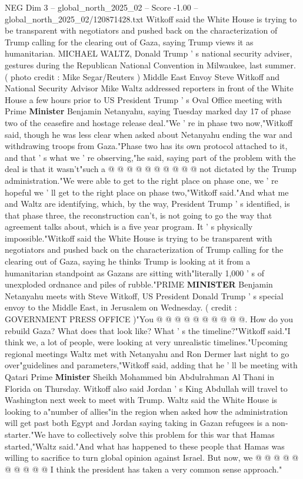 \begin{textsample}{NEG Dim 3 – global\_north\_2025\_02 – Score -1.00 – global\_north\_2025\_02/120871428.txt}  \label{ex:f3_neg_169}
Witkoff said the White House is trying to be transparent with negotiators and pushed back on the characterization of Trump calling for the clearing out of Gaza, saying Trump views it as humanitarian.
MICHAEL WALTZ, Donald Trump ' s national security adviser, gestures during the Republican National Convention in Milwaukee, last summer. ( photo credit : Mike Segar/Reuters ) Middle East Envoy Steve Witkoff and National Security Advisor Mike Waltz addressed reporters in front of the White House a few hours prior to US President Trump ' s Oval Office meeting with Prime \textbf{Minister} Benjamin Netanyahu, saying Tuesday marked day 17 of phase two of the ceasefire and hostage release deal."We ' re in phase two now,"Witkoff said, though he was less clear when asked about Netanyahu ending the war and withdrawing troops from Gaza."Phase two has its own protocol attached to it, and that ' s what we ' re observing,"he said, saying part of the problem with the deal is that it wasn't"such a @ @ @ @ @ @ @ @ @ @ not dictated by the Trump administration."We were able to get to the right place on phase one, we ' re hopeful we ' ll get to the right place on phase two,"Witkoff said."And what me and Waltz are identifying, which, by the way, President Trump ' s identified, is that phase three, the reconstruction can't, is not going to go the way that agreement talks about, which is a five year program.
It ' s physically impossible."Witkoff said the White House is trying to be transparent with negotiators and pushed back on the characterization of Trump calling for the clearing out of Gaza, saying he thinks Trump is looking at it from a humanitarian standpoint as Gazans are sitting with"literally 1,000 ' s of unexploded ordnance and piles of rubble."PRIME \textbf{MINISTER} Benjamin Netanyahu meets with Steve Witkoff, US President Donald Trump ' s special envoy to the Middle East, in Jerusalem on Wednesday. ( credit : GOVERNMENT PRESS OFFICE )"You @ @ @ @ @ @ @ @ @ @.
How do you rebuild Gaza?
What does that look like?
What ' s the timeline?"Witkoff said."I think we, a lot of people, were looking at very unrealistic timelines."Upcoming regional meetings Waltz met with Netanyahu and Ron Dermer last night to go over"guidelines and parameters,"Witkoff said, adding that he ' ll be meeting with Qatari Prime \textbf{Minister} Sheikh Mohammed bin Abdulrahman Al Thani in Florida on Thursday.
Witkoff also said Jordan ' s King Abdullah will travel to Washington next week to meet with Trump.
Waltz said the White House is looking to a"number of allies"in the region when asked how the administration will get past both Egypt and Jordan saying taking in Gazan refugees is a non-starter."We have to collectively solve this problem for this war that Hamas started,"Waltz said."And what has happened to these people that Hamas was willing to sacrifice to turn global opinion against Israel.
But now, we @ @ @ @ @ @ @ @ @ @ I think the president has taken a very common sense approach."

\end{textsample}
